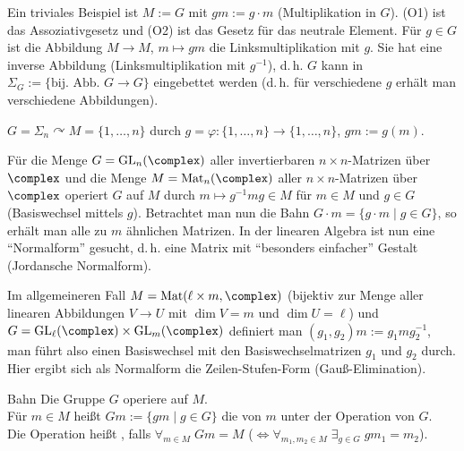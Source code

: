 \begin{Bsp}
    Ein triviales Beispiel ist
    $M := G$ mit $gm := g \cdot m$ (Multiplikation in $G$).
    (O1) ist das Assoziativgesetz und
    (O2) ist das Gesetz für das neutrale Element.
    Für $g \in G$ ist die Abbildung $M \rightarrow M$, $m \mapsto gm$
    die Linksmultiplikation mit $g$.
    Sie hat eine inverse Abbildung (Linksmultiplikation mit $g^{-1}$), d.\,h.
    $G$ kann in $\Sigma_G := \{\text{bij. Abb. } G \rightarrow G\}$
    eingebettet werden (d.\,h. für verschiedene $g$ erhält man verschiedene
    Abbildungen).
\end{Bsp}

\begin{Bsp}
    $G = \Sigma_n \curvearrowright M = \{1, \dotsc, n\}$ durch
    $g = \varphi\colon \{1, \dotsc, n\} \rightarrow \{1, \dotsc, n\}$,
    $gm := g(m)$.
\end{Bsp}

\linie

\begin{Bsp}
    Für die Menge $G = \GL_n(\complex)$ aller invertierbaren
    $n \times n$-Matrizen über $\complex$ und die Menge
    $M = \Mat_n(\complex)$ aller $n \times n$-Matrizen über $\complex$ operiert
    $G$ auf $M$ durch $m \mapsto g^{-1} m g \in M$
    für $m \in M$ und $g \in G$ (Basiswechsel mittels $g$).
    Betrachtet man nun die Bahn $G \cdot m = \{g \cdot m \;|\; g \in G\}$,
    so erhält man alle zu $m$ ähnlichen Matrizen.
    In der linearen Algebra ist nun eine "`Normalform"' gesucht, d.\,h.
    eine Matrix mit "`besonders einfacher"' Gestalt
    (Jordansche Normalform).
\end{Bsp}

\begin{Bsp}
    Im allgemeineren Fall $M = \Mat(\ell \times m, \complex)$
    (bijektiv zur Menge aller linearen Abbildungen $V \rightarrow U$
    mit $\dim V = m$ und $\dim U = \ell$) und
    $G = \GL_\ell(\complex) \times \GL_m(\complex)$ definiert man
    $(g_1, g_2)m := g_1 m g_2^{-1}$, man führt also einen Basiswechsel
    mit den Basiswechselmatrizen $g_1$ und $g_2$ durch.
    Hier ergibt sich als Normalform die Zeilen-Stufen-Form
    (Gauß-Elimination).
\end{Bsp}

\linie

\begin{Def}{Bahn}
    Die Gruppe $G$ operiere auf $M$.\\
    Für $m \in M$ heißt $Gm := \{gm \;|\; g \in G\}$ die 
    von $m$ unter der Operation von $G$.\\
    Die Operation heißt , falls
    $\forall_{m \in M}\; Gm = M$ ($\!\!\iff
    \forall_{m_1, m_2 \in M}\; \exists_{g \in G}\; g m_1 = m_2$).
\end{Def}

